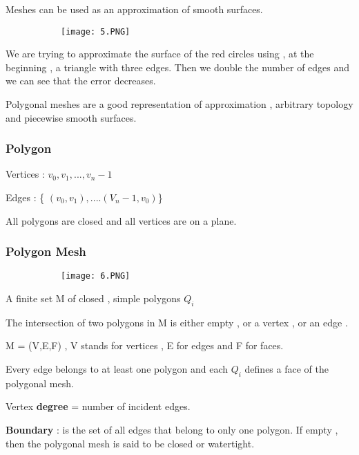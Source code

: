 \documentclass{article}
\begin{document}
Meshes can be used as an approximation of smooth surfaces.

\begin{figure}[ht!]
  \centering
  \begin{subfigure}[b]{0.7\linewidth}
    \texttt{[image: 5.PNG]}
  \end{subfigure}
\end{figure}

We are  trying to approximate the surface of the red circles using , at the beginning , a triangle with three edges. Then we double the number of edges and we can see that the error decreases.

Polygonal meshes are a good representation of approximation , arbitrary topology and piecewise smooth surfaces.


\subsubsection{Polygon}

Vertices : $v_0,v_1,...,v_n-1$

Edges : \{ $(v_0,v_1),....(V_n-1,v_0)$\}

All polygons are closed and all vertices are on a plane.

\subsubsection{Polygon Mesh}

\begin{figure}[ht!]
  \centering
  \begin{subfigure}[b]{0.2 \linewidth}
    \texttt{[image: 6.PNG]}
  \end{subfigure}
\end{figure}

A finite set M of closed , simple polygons $Q_i$

The intersection of two polygons in M is either empty , or a vertex , or an edge .

M = (V,E,F) , V stands for vertices , E for edges and F for faces.

Every edge belongs to at least one polygon and each $Q_i$ defines a face of the polygonal mesh.


Vertex \textbf{degree} = number of incident edges.

\textbf{Boundary} : is the set of all edges that belong to only one polygon. If empty , then the polygonal mesh is said to be closed or watertight.
\end{document}
